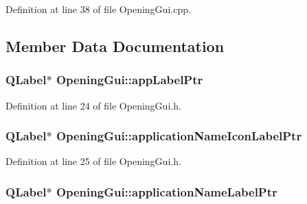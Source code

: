Definition at line 38 of file Opening\-Gui.\-cpp.



\subsection{Member Data Documentation}
\hypertarget{class_opening_gui_a774269567530a475bbd5f5fb485ee023}{
\subsubsection[{app\-Label\-Ptr}]{\setlength{\rightskip}{0pt plus 5cm}Q\-Label$\ast$ Opening\-Gui\-::app\-Label\-Ptr\hspace{0.3cm}{\ttfamily [private]}}}\label{class_opening_gui_a774269567530a475bbd5f5fb485ee023}


Definition at line 24 of file Opening\-Gui.\-h.

\hypertarget{class_opening_gui_acdfc9f6f1c81e877a3837afcdfba7875}{
\subsubsection[{application\-Name\-Icon\-Label\-Ptr}]{\setlength{\rightskip}{0pt plus 5cm}Q\-Label$\ast$ Opening\-Gui\-::application\-Name\-Icon\-Label\-Ptr\hspace{0.3cm}{\ttfamily [private]}}}\label{class_opening_gui_acdfc9f6f1c81e877a3837afcdfba7875}


Definition at line 25 of file Opening\-Gui.\-h.

\hypertarget{class_opening_gui_a14f81e2da5ce61335a154282bc1ba581}{
\subsubsection[{application\-Name\-Label\-Ptr}]{\setlength{\rightskip}{0pt plus 5cm}Q\-Label$\ast$ Opening\-Gui\-::application\-Name\-Label\-Ptr\hspace{0.3cm}{\ttfamily [private]}}}\label{class_opening_gui_a14f81e2da5ce61335a154282bc1ba581}


